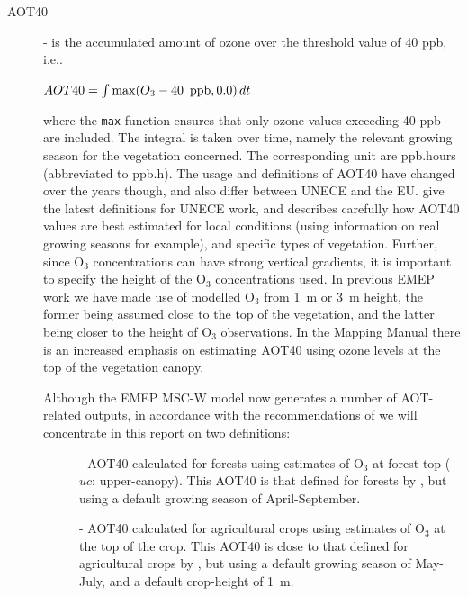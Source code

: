 \begin{description}
     \item[AOT40] -
is the accumulated amount of ozone over the threshold value of 40 ppb, i.e..

\begin{math}
AOT40 = \int \max(O_3 - 40 \mbox{\, ppb}, 0.0) \, dt
\end{math}


where the {\tt max} function ensures that only ozone values exceeding 40
ppb are included.  The integral is taken over time, namely the
relevant growing season for the vegetation concerned. The
corresponding unit are ppb.hours (abbreviated to ppb.h).  The usage
and definitions of AOT40 have changed over the years though, and also
differ between UNECE and the EU.
\cite{MappingManual:Veg} give the latest definitions for UNECE work, and
describes carefully how AOT40 values are best estimated for local
conditions (using information on real growing seasons for example),
and specific types of vegetation.  Further, since O$_3$ concentrations
can have strong vertical gradients, it is important to specify the
height of the O$_3$ concentrations used. In previous EMEP work we have
made use of modelled O$_3$ from 1~m or 3~m height, the former being
assumed close to the top of the vegetation, and the latter being
closer to the height of O$_3$ observations.  In the Mapping Manual
\cite[]{MappingManual:Veg} there is an increased emphasis on
estimating AOT40 using ozone levels at the top of the vegetation
canopy.

Although the EMEP MSC-W model now generates a number of AOT-related outputs,
in accordance with the recommendations of \cite{MappingManual:Veg}
we will concentrate in this report on two definitions:

\begin{description}
   \item[\aotucf] %
     - AOT40 calculated for
   forests using estimates of O$_3$ at forest-top ($uc$:
   upper-canopy). This AOT40 is that defined for forests by
   \cite{MappingManual:Veg}, but using a default growing season of
   April-September.
   \item[\aotucc] %
     - AOT40
   calculated for agricultural crops using estimates of O$_3$ at the
   top of the crop. This AOT40 is close to that defined for
   agricultural crops by \cite{MappingManual:Veg}, but using a default
   growing season of May-July, and a default crop-height of 1~m.
\end{description}


\end{description}
